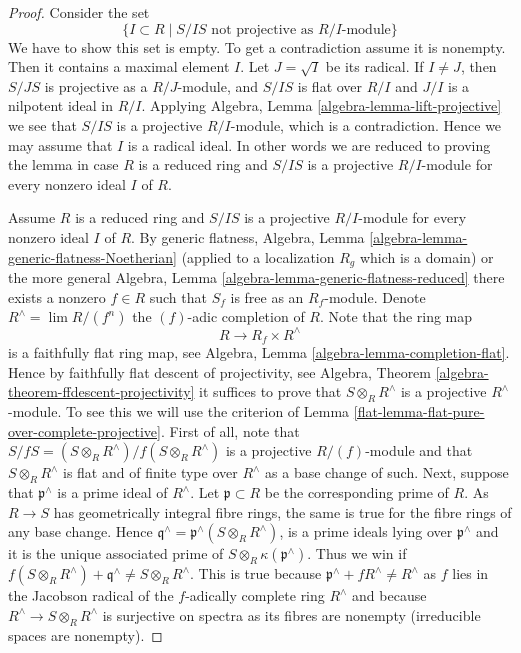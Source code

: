 \begin{proof}

Consider the set
$$
\{I \subset R \mid S/IS\text{ not projective as }R/I\text{-module}\}
$$
We have to show this set is empty. To get a contradiction assume it is
nonempty. Then it contains a maximal element $I$.
Let $J = \sqrt{I}$ be its radical. If $I \not = J$, then
$S/JS$ is projective as a $R/J$-module, and $S/IS$ is flat over $R/I$
and $J/I$ is a nilpotent ideal in $R/I$. Applying
Algebra, Lemma \ref{algebra-lemma-lift-projective}
we see that $S/IS$ is a projective $R/I$-module, which is a contradiction.
Hence we may assume that $I$ is a radical ideal. In other words we
are reduced to proving the lemma in case $R$ is a reduced ring and
$S/IS$ is a projective $R/I$-module for every nonzero ideal $I$
of $R$.

\medskip\noindent
Assume $R$ is a reduced ring and $S/IS$ is a projective $R/I$-module
for every nonzero ideal $I$ of $R$. By generic flatness,
Algebra, Lemma \ref{algebra-lemma-generic-flatness-Noetherian}
(applied to a localization $R_g$ which is a domain) or the more general
Algebra, Lemma \ref{algebra-lemma-generic-flatness-reduced}
there exists a nonzero $f \in R$ such that $S_f$ is free as an
$R_f$-module. Denote $R^\wedge = \lim R/(f^n)$ the $(f)$-adic completion
of $R$. Note that the ring map
$$
R \longrightarrow R_f \times R^\wedge
$$
is a faithfully flat ring map, see
Algebra, Lemma \ref{algebra-lemma-completion-flat}.
Hence by faithfully flat descent of projectivity, see
Algebra, Theorem \ref{algebra-theorem-ffdescent-projectivity}
it suffices to prove that $S \otimes_R R^\wedge$ is a projective
$R^\wedge$-module. To see this we will use the criterion of
Lemma \ref{flat-lemma-flat-pure-over-complete-projective}.
First of all, note that $S/fS = (S \otimes_R R^\wedge)/f(S \otimes_R R^\wedge)$
is a projective $R/(f)$-module and that $S \otimes_R R^\wedge$ is flat
and of finite type over $R^\wedge$ as a base change of such.
Next, suppose that $\mathfrak p^\wedge$ is a prime ideal
of $R^\wedge$. Let $\mathfrak p \subset R$ be the corresponding prime
of $R$. As $R \to S$ has geometrically integral fibre rings, the
same is true for the fibre rings of any base change. Hence
$\mathfrak q^\wedge = \mathfrak p^\wedge(S \otimes_R R^\wedge)$,
is a prime ideals lying over $\mathfrak p^\wedge$
and it is the unique associated prime of
$S \otimes_R \kappa(\mathfrak p^\wedge)$. Thus we win if
$f(S \otimes_R R^\wedge) + \mathfrak q^\wedge \not = S \otimes_R R^\wedge$.
This is true because $\mathfrak p^\wedge + fR^\wedge \not = R^\wedge$ as
$f$ lies in the Jacobson radical of the $f$-adically complete ring $R^\wedge$
and because $R^\wedge \to S \otimes_R R^\wedge$ is surjective on spectra
as its fibres are nonempty (irreducible spaces are nonempty).
\end{proof}


